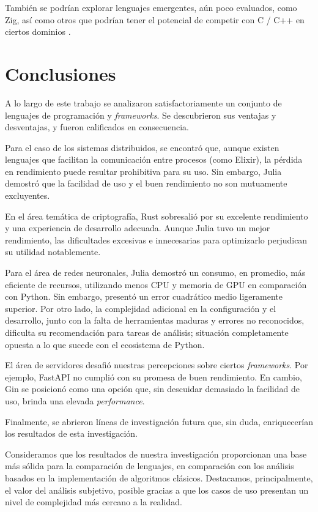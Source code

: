 \documentclass[11pt]{article}
\let\Oldsection\section
\renewcommand{\section}{\FloatBarrier\Oldsection}
\newcommand{\english}[1]{\textit{#1}}
\begin{document}
También se podrían explorar lenguajes emergentes, aún poco evaluados, como Zig, así como otros que podrían tener el potencial de competir con C / C++ en ciertos dominios \cite{cpp_killers}.

\newpage

\section{Conclusiones}

A lo largo de este trabajo se analizaron satisfactoriamente un conjunto de lenguajes de programación y \textit{frameworks}. Se descubrieron sus ventajas y desventajas, y fueron calificados en consecuencia.

Para el caso de los sistemas distribuidos, se encontró que, aunque existen lenguajes que facilitan la comunicación entre procesos (como Elixir), la pérdida en rendimiento puede resultar prohibitiva para su uso. Sin embargo, Julia demostró que la facilidad de uso y el buen rendimiento no son mutuamente excluyentes.

En el área temática de criptografía, Rust sobresalió por su excelente rendimiento y una experiencia de desarrollo adecuada. Aunque Julia tuvo un mejor rendimiento, las dificultades excesivas e innecesarias para optimizarlo perjudican su utilidad notablemente.

Para el área de redes neuronales, Julia demostró un consumo, en promedio, más eficiente de recursos, utilizando menos CPU y memoria de GPU en comparación con Python. Sin embargo, presentó un error cuadrático medio ligeramente superior. Por otro lado, la complejidad adicional en la configuración y el desarrollo, junto con la falta de herramientas maduras y errores no reconocidos, dificulta su recomendación para tareas de análisis; situación completamente opuesta a lo que sucede con el ecosistema de Python.

El área de servidores desafió nuestras percepciones sobre ciertos \textit{frameworks}. Por ejemplo, FastAPI no cumplió con su promesa de buen rendimiento. En cambio, Gin se posicionó como una opción que, sin descuidar demasiado la facilidad de uso, brinda una elevada \english{performance}.

Finalmente, se abrieron líneas de investigación futura que, sin duda, enriquecerían los resultados de esta investigación.

Consideramos que los resultados de nuestra investigación proporcionan una base más sólida para la comparación de lenguajes, en comparación con los análisis basados en la implementación de algoritmos clásicos. Destacamos, principalmente, el valor del análisis subjetivo, posible gracias a que los casos de uso presentan un nivel de complejidad más cercano a la realidad.
\end{document}
